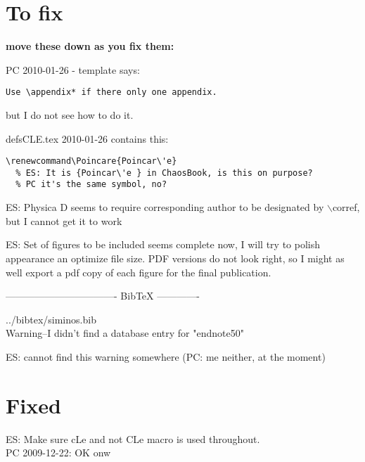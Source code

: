 
\section{To fix}

{\bf move these down as you fix them:}

PC 2010-01-26 - template says:
\begin{verbatim}
Use \appendix* if there only one appendix.
\end{verbatim}
but I do not see how to do it.

defsCLE.tex  2010-01-26 contains this:
\begin{verbatim}
\renewcommand\Poincare{Poincar\'e}
  % ES: It is {Poincar\'e } in ChaosBook, is this on purpose?
  % PC it's the same symbol, no?
\end{verbatim}

ES: Physica D seems to require corresponding author to be
designated by $\backslash$corref, but I cannot get it to work

ES: Set of figures to be included seems complete now, I will
try to polish appearance an optimize file size. PDF versions
do not look right, so I might as well export a pdf copy of
each figure for the final publication.


---------------------------------- BibTeX -------------

../bibtex/siminos.bib
\\
Warning--I didn't find a database entry for "endnote50"

ES: cannot find this warning somewhere
(PC: me neither, at the moment)

\section*{Fixed}

ES: Make sure cLe and not CLe macro is used throughout.
\\
PC 2009-12-22: OK onw
